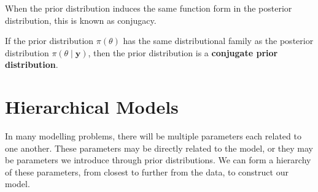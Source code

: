 \documentclass[
]{book}
\theoremstyle{definition}
\theoremstyle{definition}
\theoremstyle{definition}
\theoremstyle{definition}
\theoremstyle{remark}
\begin{document}
When the prior distribution induces the same function form in the posterior distribution, this is known as conjugacy.

If the prior distribution \(\pi(\theta)\) has the same distributional family as the posterior distribution \(\pi(\theta \mid \boldsymbol{y})\), then the prior distribution is a \textbf{conjugate prior distribution}.

\hypertarget{hierarchical-models}{%
\section{Hierarchical Models}\label{hierarchical-models}}

In many modelling problems, there will be multiple parameters each related to one another. These parameters may be directly related to the model, or they may be parameters we introduce through prior distributions. We can form a hierarchy of these parameters, from closest to further from the data, to construct our model.
\end{document}
